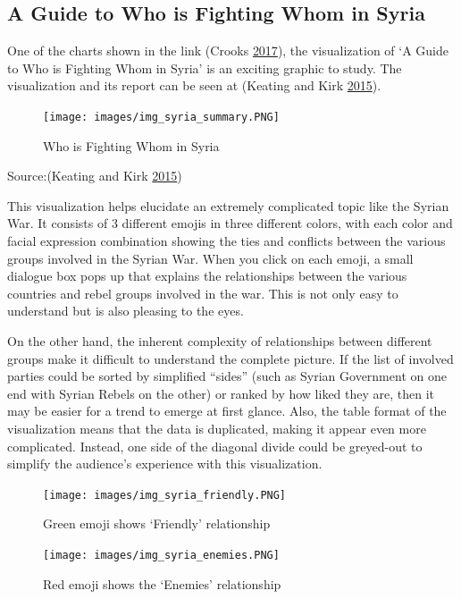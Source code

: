 \documentclass[]{book}
\begin{document}
\hypertarget{a-guide-to-who-is-fighting-whom-in-syria}{%
\subsection{A Guide to Who is Fighting Whom in Syria}\label{a-guide-to-who-is-fighting-whom-in-syria}}

One of the charts shown in the link (Crooks \protect\hyperlink{ref-int_viz_capt}{2017}), the visualization of `A Guide to Who is Fighting Whom in Syria' is an exciting graphic to study. The visualization and its report can be seen at (Keating and Kirk \protect\hyperlink{ref-syria_chart}{2015}).

\begin{figure}
\centering
\texttt{[image: images/img\_syria\_summary.PNG]}
\caption{Who is Fighting Whom in Syria}
\end{figure}

Source:(Keating and Kirk \protect\hyperlink{ref-syria_chart}{2015})

This visualization helps elucidate an extremely complicated topic like the Syrian War. It consists of 3 different emojis in three different colors, with each color and facial expression combination showing the ties and conflicts between the various groups involved in the Syrian War. When you click on each emoji, a small dialogue box pops up that explains the relationships between the various countries and rebel groups involved in the war. This is not only easy to understand but is also pleasing to the eyes.

On the other hand, the inherent complexity of relationships between different groups make it difficult to understand the complete picture. If the list of involved parties could be sorted by simplified ``sides'' (such as Syrian Government on one end with Syrian Rebels on the other) or ranked by how liked they are, then it may be easier for a trend to emerge at first glance. Also, the table format of the visualization means that the data is duplicated, making it appear even more complicated. Instead, one side of the diagonal divide could be greyed-out to simplify the audience's experience with this visualization.

\begin{figure}
\centering
\texttt{[image: images/img\_syria\_friendly.PNG]}
\caption{Green emoji shows `Friendly' relationship}
\end{figure}

\begin{figure}
\centering
\texttt{[image: images/img\_syria\_enemies.PNG]}
\caption{Red emoji shows the `Enemies' relationship}
\end{figure}
\end{document}
